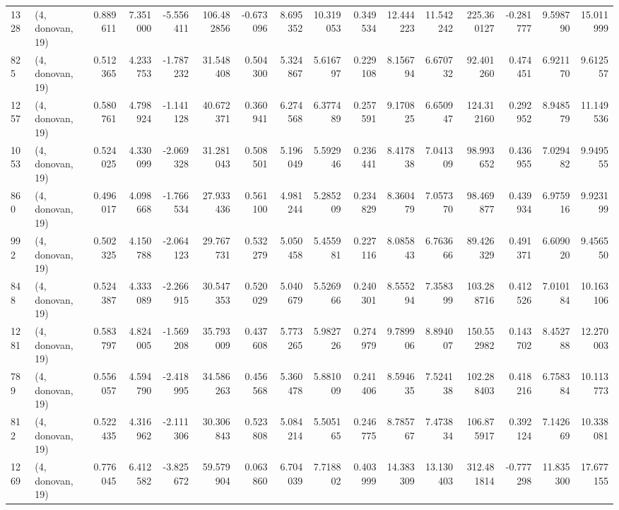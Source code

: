 \begin{tabular}{llrrrrrrrrrrrrrr}
1328 &  (4, donovan, 19) &   0.889611 &   7.351000 &  -5.556411 &    106.482856 &   -0.673096 &    8.695352 &   10.319053 &  0.349534 &  12.444223 &  11.542242 &   225.360127 &  -0.281777 &   9.598790 &  15.011999 \\
825  &  (4, donovan, 19) &   0.512365 &   4.233753 &  -1.787232 &     31.548408 &    0.504300 &    5.324867 &    5.616797 &  0.229108 &   8.156794 &   6.670732 &    92.401260 &   0.474451 &   6.921170 &   9.612557 \\
1257 &  (4, donovan, 19) &   0.580761 &   4.798924 &  -1.141128 &     40.672371 &    0.360941 &    6.274568 &    6.377489 &  0.257591 &   9.170825 &   6.650947 &   124.312160 &   0.292952 &   8.948579 &  11.149536 \\
1053 &  (4, donovan, 19) &   0.524025 &   4.330099 &  -2.069328 &     31.281043 &    0.508501 &    5.196049 &    5.592946 &  0.236441 &   8.417838 &   7.041309 &    98.993652 &   0.436955 &   7.029482 &   9.949555 \\
860  &  (4, donovan, 19) &   0.496017 &   4.098668 &  -1.766534 &     27.933436 &    0.561100 &    4.981244 &    5.285209 &  0.234829 &   8.360479 &   7.057370 &    98.469877 &   0.439934 &   6.975916 &   9.923199 \\
992  &  (4, donovan, 19) &   0.502325 &   4.150788 &  -2.064123 &     29.767731 &    0.532279 &    5.050458 &    5.455981 &  0.227116 &   8.085843 &   6.763666 &    89.426329 &   0.491371 &   6.609020 &   9.456550 \\
848  &  (4, donovan, 19) &   0.524387 &   4.333089 &  -2.266915 &     30.547353 &    0.520029 &    5.040679 &    5.526966 &  0.240301 &   8.555294 &   7.358399 &   103.288716 &   0.412526 &   7.010184 &  10.163106 \\
1281 &  (4, donovan, 19) &   0.583797 &   4.824005 &  -1.569208 &     35.793009 &    0.437608 &    5.773265 &    5.982726 &  0.274979 &   9.789906 &   8.894007 &   150.552982 &   0.143702 &   8.452788 &  12.270003 \\
789  &  (4, donovan, 19) &   0.556057 &   4.594790 &  -2.418995 &     34.586263 &    0.456568 &    5.360478 &    5.881009 &  0.241406 &   8.594635 &   7.524138 &   102.288403 &   0.418216 &   6.758384 &  10.113773 \\
812  &  (4, donovan, 19) &   0.522435 &   4.316962 &  -2.111306 &     30.306843 &    0.523808 &    5.084214 &    5.505165 &  0.246775 &   8.785767 &   7.473834 &   106.875917 &   0.392124 &   7.142669 &  10.338081 \\
1269 &  (4, donovan, 19) &   0.776045 &   6.412582 &  -3.825672 &     59.579904 &    0.063860 &    6.704039 &    7.718802 &  0.403999 &  14.383309 &  13.130403 &   312.481814 &  -0.777298 &  11.835300 &  17.677155 \\

\end{tabular}
